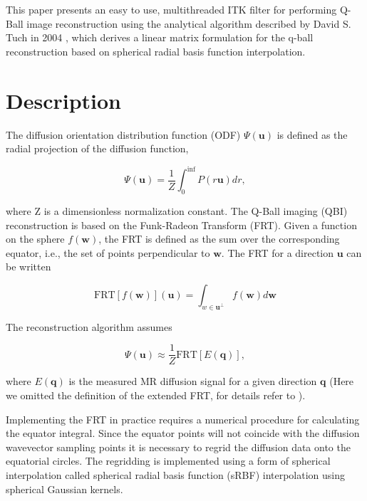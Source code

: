 \documentclass{InsightArticle}
\begin{document}
This paper presents an easy to use, multithreaded ITK filter for performing Q-Ball image reconstruction using the analytical algorithm described by David S. Tuch in 2004 \cite{Tuch2004}, which derives a linear matrix formulation for the q-ball reconstruction
based on spherical radial basis function interpolation.

\section{Description}
The diffusion orientation distribution function (ODF) $\Psi(\textbf{u})$ is defined as the radial projection of the diffusion function,

\begin{equation}
\Psi(\textbf{u}) = 
\frac{1}{Z}\int^{\mbox{inf}}_{0}P(r\textbf{u})dr,
\end{equation}

where Z is a dimensionless normalization constant. The Q-Ball imaging (QBI) reconstruction is based on the Funk-Radeon Transform (FRT). Given a function on the sphere $f(\textbf{w})$, the FRT is defined as the sum over the corresponding equator, i.e., the set of points perpendicular to $\textbf{w}$. The FRT for a direction $\textbf{u}$ can be written 

\begin{equation}
\mbox{FRT} 
\left[ 
f( \textbf{w} ) 
\right] 
( \textbf{u})
=
\int^{}_{w\in\textbf{u}^\bot} 
f(\textbf{w}) d \textbf{w}
\end{equation}

The reconstruction algorithm assumes

\begin{equation}
\Psi(\textbf{u}) \approx 
\frac{1}{Z} \mbox{FRT} \left[ E(\textbf{q}) \right],
\end{equation}

where $E(\textbf{q})$ is the measured MR diffusion signal for a given direction $\textbf{q}$ (Here we omitted the definition of the extended FRT, for details refer to \cite{Tuch2004}).

Implementing the FRT in practice requires a numerical
procedure for calculating the equator integral. Since the
equator points will not coincide with the diffusion
wavevector sampling points it is necessary to regrid the
diffusion data onto the equatorial circles. The regridding
is implemented using a form of spherical interpolation
called spherical radial basis function (sRBF) interpolation using spherical Gaussian kernels.
\end{document}
